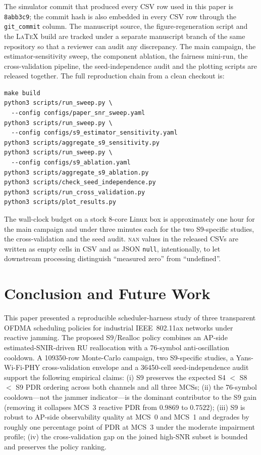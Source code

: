\documentclass[journal,onecolumn,11pt,a4paper]{IEEEtran}
\begin{document}
The simulator commit that produced every CSV row used in this
paper is \texttt{8abb3c9}; the commit hash is also embedded in
every CSV row through the \texttt{git\_commit} column. The
manuscript source, the figure-regeneration script and the
\textsc{LaTeX} build are tracked under a separate manuscript
branch of the same repository so that a reviewer can audit any
discrepancy. The main campaign, the estimator-sensitivity sweep,
the component ablation, the fairness mini-run, the cross-validation
pipeline, the seed-independence audit and the plotting scripts are
released together. The full reproduction chain from a clean
checkout is:

\begin{verbatim}
make build
python3 scripts/run_sweep.py \
  --config configs/paper_snr_sweep.yaml
python3 scripts/run_sweep.py \
  --config configs/s9_estimator_sensitivity.yaml
python3 scripts/aggregate_s9_sensitivity.py
python3 scripts/run_sweep.py \
  --config configs/s9_ablation.yaml
python3 scripts/aggregate_s9_ablation.py
python3 scripts/check_seed_independence.py
python3 scripts/run_cross_validation.py
python3 scripts/plot_results.py
\end{verbatim}

The wall-clock budget on a stock 8-core Linux box is approximately one
hour for the main campaign and under three minutes each for the two
S9-specific studies, the cross-validation and the seed audit.
\textsc{nan} values in the released CSVs are written as empty cells
in CSV and as JSON \texttt{null}, intentionally, to let downstream
processing distinguish ``measured zero'' from ``undefined''.

\section{Conclusion and Future Work}
\label{sec:conclusion}

This paper presented a reproducible scheduler-harness study of three
transparent OFDMA scheduling policies for industrial IEEE~802.11ax
networks under reactive jamming. The proposed S9/Realloc policy
combines an AP-side estimated-SNIR-driven RU reallocation with a
\SI{76}{}-symbol anti-oscillation cooldown. A \num{109350}-row
Monte-Carlo campaign, two S9-specific studies, a Yans-Wi-Fi-PHY
cross-validation envelope and a \num{36450}-cell seed-independence
audit support the following empirical claims: (i) S9 preserves the
expected S4 $<$ S8 $<$ S9 PDR ordering across both channels and all
three MCSs; (ii) the \SI{76}{}-symbol cooldown---not the jammer
indicator---is the dominant contributor to the S9 gain (removing it
collapses MCS~3 reactive PDR from $0.9869$ to $0.7522$); (iii) S9 is
robust to AP-side observability quality at MCS~0 and MCS~1 and
degrades by roughly one percentage point of PDR at MCS~3 under the
moderate impairment profile; (iv) the cross-validation gap on the
joined high-SNR subset is bounded and preserves the policy ranking.
\end{document}
